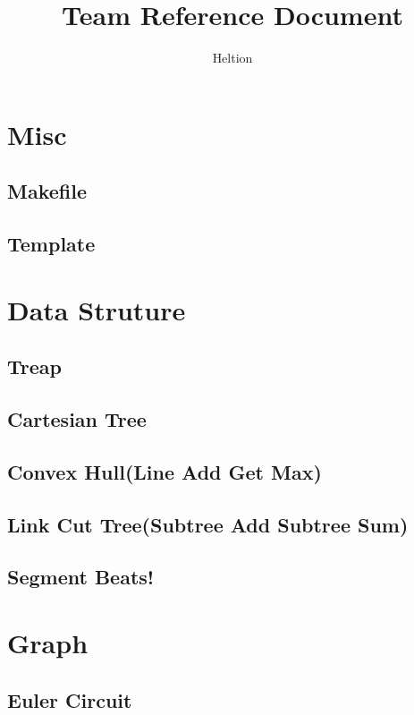\documentclass{article}
\begin{document}
\title{Team Reference Document}
\author{Heltion}
\maketitle
\newpage
\tableofcontents
\newpage
\section{Misc}
    \subsection{Makefile}
        
    \subsection{Template}
        
\section{Data Struture}
    \subsection{Treap}
        
    \subsection{Cartesian Tree}
        
    \subsection{Convex Hull(Line Add Get Max)}
        
    \subsection{Link Cut Tree(Subtree Add Subtree Sum)}
        
    \subsection{Segment Beats!}
        
\section{Graph}


    \subsection{Euler Circuit}
\end{document}
